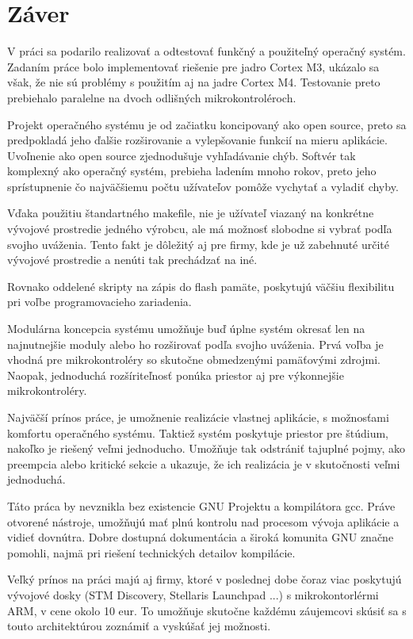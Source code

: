 \chapter*{Záver}

V práci sa podarilo realizovať a odtestovať funkčný a použiteľný operačný systém. Zadaním práce bolo implementovať riešenie pre jadro Cortex M3, ukázalo sa však, že nie sú problémy s použitím aj na jadre Cortex M4. Testovanie preto prebiehalo paralelne na dvoch odlišných mikrokontroléroch.

Projekt operačného systému je od začiatku koncipovaný ako open source, preto sa predpokladá jeho ďalšie rozširovanie a vylepšovanie funkcií na mieru aplikácie.
Uvoľnenie ako open source zjednodušuje vyhľadávanie chýb. Softvér tak komplexný ako operačný systém, prebieha ladením mnoho rokov, preto jeho sprístupnenie čo najväčšiemu počtu užívateľov pomôže vychytať a vyladiť chyby.

Vďaka použitiu štandartného makefile, nie je užívateľ viazaný na konkrétne vývojové prostredie jedného výrobcu, ale má možnosť slobodne si vybrať podľa svojho uváženia. Tento fakt je dôležitý aj pre firmy, kde je už zabehnuté určité vývojové prostredie a nenúti tak prechádzať na iné.

Rovnako oddelené skripty na zápis do flash pamäte, poskytujú väčšiu flexibilitu pri voľbe programovacieho zariadenia. 

Modulárna koncepcia systému umožňuje buď úplne systém okresať len na najnutnejšie moduly alebo ho rozširovať podľa svojho uváženia. Prvá voľba je vhodná pre mikrokontroléry so skutočne obmedzenými pamäťovými zdrojmi. Naopak, jednoduchá rozšíriteľnosť ponúka priestor aj pre výkonnejšie mikrokontroléry.

Najväčší prínos práce, je umožnenie realizácie vlastnej aplikácie, s možnosťami komfortu operačného systému. Taktiež systém poskytuje priestor pre štúdium, nakoľko je riešený veľmi jednoducho. Umožňuje tak odstrániť tajuplné pojmy, ako preempcia alebo kritické sekcie a ukazuje, že ich realizácia je v skutočnosti veľmi jednoduchá.

Táto práca by nevznikla bez existencie GNU Projektu a kompilátora gcc. Práve otvorené nástroje, umožňujú mať plnú kontrolu nad procesom vývoja aplikácie a vidieť dovnútra. Dobre dostupná dokumentácia a široká komunita GNU značne pomohli, najmä pri riešení technických detailov kompilácie.

Veľký prínos na práci majú aj firmy, ktoré v poslednej dobe čoraz viac poskytujú vývojové dosky (STM Discovery, Stellaris Launchpad ...) s mikrokontorlérmi ARM, v cene okolo 10 eur. To umožňuje skutočne každému záujemcovi skúsiť sa s touto architektúrou zoznámiť a vyskúšať jej možnosti.
